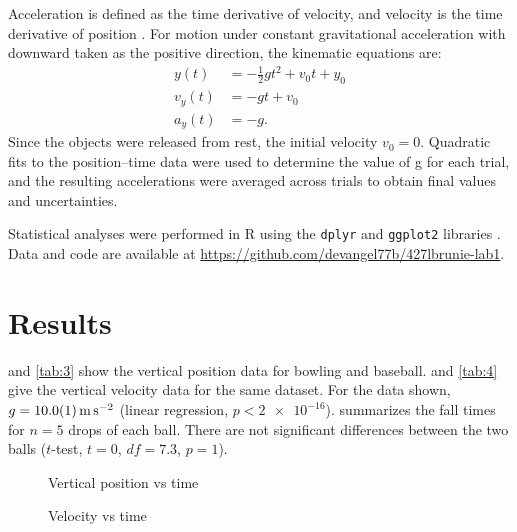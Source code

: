 \documentclass[reprint,amsmath,amssymb,aps,twoside]{revtex4-2}
\begin{document}
Acceleration is defined as the time derivative of velocity, and velocity is the time derivative of position \cite{tipler,openstax,barrons}. For motion under constant gravitational acceleration with downward taken as the positive direction, the kinematic equations are:
\begin{align}
y(t) &= -\frac{1}{2} g t^2 + v_0 t + y_0 \\
v_y(t) &= - g t + v_0 \\
a_y(t) &= - g.
\end{align}
Since the objects were released from rest, the initial velocity $v_0=0$. Quadratic fits to the position–time data were used to determine the value of g for each trial, and the resulting accelerations were averaged across trials to obtain final values and uncertainties.

Statistical analyses \cite{starnes:2015:practice} were performed in R \cite{R} using the \texttt{dplyr} and \texttt{ggplot2} libraries \cite{dplyr,ggplot2}. Data and code are available at \url{https://github.com/devangel77b/427lbrunie-lab1}.






\section{Results}
 and \cref{tab:3} show the vertical position data for bowling and baseball.  and \cref{tab:4} give the vertical velocity data for the same dataset. For the data shown, $g=\qty{10.0\pm0.1}{\meter\per\second\squared}$ (linear regression, $p<\num{2e-16}$).  summarizes the fall times for $n=5$ drops of each ball. There are not significant differences between the two balls ($t$-test, $t=0$, $df=7.3$, $p=1$). 

\begin{figure}
\begin{center}

\end{center}
\caption{Vertical position vs time}
\label{fig:1}
\end{figure}
\begin{figure}
\begin{center}

\end{center}
\caption{Velocity vs time}
\label{fig:2}
\end{figure}
\end{document}
